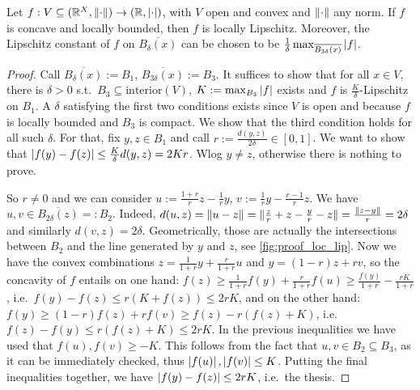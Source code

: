 \begin{theorem}\label{th:locLip}
Let $f:V\subseteq (\mathbb{R}^X,\lVert\cdot\rVert) \to (\mathbb{R},\left\lvert\cdot\right\rvert)$, with $V$ open and convex and $\lVert\cdot\rVert$ any norm.
If $f$ is concave and locally bounded, then $f$ is locally Lipschitz.
Moreover, the Lipschitz constant of $f$ on $\overline{B_{\delta}(x)}$ can be chosen to be $\frac{1}{\delta}\max_{\overline{B_{3\delta}(x)}} \left\lvert f\right\rvert$.
\end{theorem}
\begin{proof}
 Call $\overline{B_{\delta}(x)}:=B_1$, $\overline{B_{3\delta}(x)}:=B_3$.
 It suffices to show that for all $x\in V$, there is $\delta>0$ s.t.\ $B_3\subseteq \mathrm{interior}(V)$, $K:=\max_{B_3}  \left\lvert f\right\rvert$ exists and $f$ is $\frac{K}{\delta}$-Lipschitz on $B_1$.
A $\delta$ satisfying the first two conditions exists since $V$ is open and because $f$ is locally bounded and $B_3$ is compact.
We show that the third condition holds for all such $\delta$.
 For that, fix $y,z\in B_1$ and call $r:=\frac{d(y,z)}{2\delta}\in[0,1]$.
 We want to show that $\left\lvert f(y)-f(z)\right\rvert\leq \frac{K}{\delta}d(y,z)=2Kr$.
 Wlog $y\neq z$, otherwise there is nothing to prove.

 So $r\neq 0$ and we can consider $u:=\frac{1+r}{r}z-\frac{1}{r}y$, $v:=\frac{1}{r}y-\frac{r-1}{r}z$.
 We have $u,v\in \overline{B_{2\delta}(z)}=:B_2$.
 Indeed, $d(u,z)=\lVert u-z\rVert=\lVert\frac{z}{r}+z-\frac{y}{r}-z\rVert=\frac{\lVert z-y\rVert}{r}=2\delta$ and similarly $d(v,z)=2\delta$.
 Geometrically, those are actually the intersections between $B_2$ and the line generated by $y$ and $z$, see \autoref{fig:proof_loc_lip}.
 Now we have the convex combinations $z=\frac{1}{1+r}y+\frac{r}{1+r}u$ and $y=(1-r)z+rv$, so the concavity of $f$ entails on one hand:
 $f(z)\geq \frac{1}{1+r}f(y)+\frac{r}{1+r}f(u)\geq \frac{f(y)}{1+r} - \frac{rK}{1+r}$, i.e.\ $f(y)-f(z)\leq r(K+f(z))\leq 2rK$, and on the other hand:
 $f(y)\geq (1-r)f(z)+rf(v)\geq f(z)-r(f(z)+K)$, i.e.\ $f(z)-f(y)\leq r(f(z)+K)\leq 2rK$.
 In the previous inequalities we have used that $f(u),f(v)\geq -K$.
 This follows from the fact that $u,v\in B_2\subseteq B_3$, as it can be immediately checked, thus $\left\lvert f(u)\right\rvert,\left\lvert f(v)\right\rvert\leq K$.
 Putting the final inequalities together, we have $\left\lvert f(y)-f(z)\right\rvert\leq 2rK$, i.e.\ the thesis.
 \end{proof}
